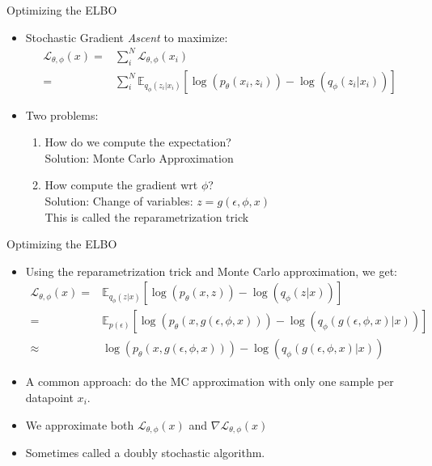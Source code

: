 \documentclass[10pt]{beamer}
\begin{document}
\begin{frame}{Optimizing the ELBO}

\begin{itemize}
\item Stochastic Gradient \emph{Ascent} to maximize:
\begin{align*}
\mathcal{L}_{\theta,\phi}(x) =& \sum_i^N \mathcal{L}_{\theta,\phi}(x_i)\\
=& \sum_i^N \mathbb{E}_{q_\phi(z_i|x_i)}\left[\log \left(p_\theta(x_i,z_i)\right) - \log(q_\phi(z_i|x_i))\right]
\end{align*}
\pause
\item Two problems:
\begin{enumerate}
\item How do we compute the expectation? \\ Solution: {\color{uured} Monte Carlo Approximation}\pause
\item How compute the gradient wrt $\phi$?\\ Solution: {\color{uured}Change of variables}: $z = g(\epsilon, \phi, x)$\\This is called {\color{uured}the reparametrization trick}
\end{enumerate}
\end{itemize}

\end{frame}

\begin{frame}{Optimizing the ELBO}

\begin{itemize}
\item Using the reparametrization trick and Monte Carlo approximation, we get:
\begin{align*}
\mathcal{L}_{\theta,\phi}(x) =& \mathbb{E}_{q_\phi(z|x)}\left[\log \left(p_\theta(x,z)\right)- \log(q_\phi(z|x))\right]\\
 =& \mathbb{E}_{p(\epsilon)}\left[\log \left(p_\theta(x,g(\epsilon, \phi, x))\right)- \log(q_\phi(g(\epsilon, \phi, x)|x))\right]\\
 \approx & \log \left(p_\theta(x,g(\epsilon, \phi, x))\right)- \log(q_\phi(g(\epsilon, \phi, x)|x))
\end{align*}
\pause
\item A common approach: do the MC approximation with only {\color{uured}one sample per datapoint $x_i$}.\pause
\item We approximate both $\mathcal{L}_{\theta,\phi}(x)$ and $\nabla\mathcal{L}_{\theta,\phi}(x)$
\pause
\item Sometimes called a {\color{uured}doubly stochastic} algorithm.
\end{itemize}

\end{frame}
\end{document}
